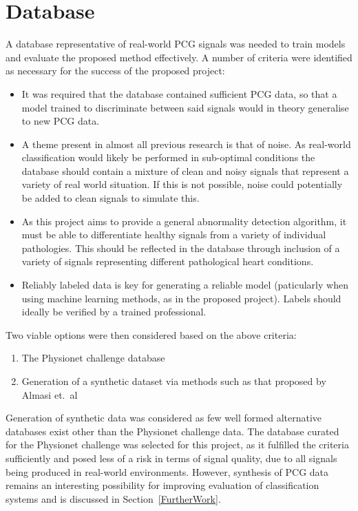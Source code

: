 \documentclass[titlepage, 12pt]{scrartcl} \usepackage{enumitem}
\begin{document}
\section{Database}\label{Database}
A database representative of real-world PCG signals was needed to train models
and evaluate the proposed method effectively.  A number of criteria were
identified as necessary for the success of the proposed project:
\begin{itemize}
    \item It was required that the database contained sufficient PCG data, so
        that a model trained to discriminate between said signals would
        in theory generalise to new PCG data.
    \item A theme present in almost all previous research is that of noise. As
        real-world classification would likely be performed in sub-optimal
        conditions the database should contain a mixture of clean and noisy
        signals that represent a variety of real world situation. If this is
        not possible, noise could potentially be added to clean signals to
        simulate this.
    \item As this project aims to provide a general abnormality detection
        algorithm, it must be able to differentiate healthy signals from a
        variety of individual pathologies. This should be reflected in the
        database through inclusion of a variety of signals representing
        different pathological heart conditions.
    \item Reliably labeled data is key for generating a reliable model
        (paticularly when using machine learning methods, as in the proposed
        project). Labels should ideally be verified by a trained professional.
\end{itemize}
\noindent
Two viable options were then considered based on the above criteria:
\begin{enumerate}
    \item The Physionet challenge database
    \item Generation of a synthetic dataset via methods such as that proposed
    by Almasi et.\ al~\parencite{Almasi2011}
\end{enumerate}

Generation of synthetic data was considered as few well formed alternative
databases exist other than the Physionet challenge data. The database curated
for the Physionet challenge was selected for this project, as it fulfilled the
criteria sufficiently and posed less of a risk in terms of signal quality, due
to all signals being produced in real-world environments.  However, synthesis
of PCG data remains an interesting possibility for improving evaluation of
classification systems and is discussed in Section~\ref{FurtherWork}.
\end{document}
